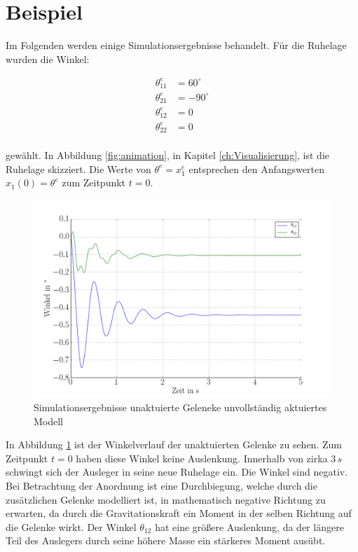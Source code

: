 \section*{Beispiel}

Im Folgenden werden einige Simulationsergebnisse behandelt. Für die Ruhelage wurden die Winkel:


\begin{align*}
\theta_{11}^e&=60^\circ\\
\theta_{21}^e&=-90^\circ\\
\theta_{12}^e&=0\\
\theta_{22}^e&=0\\
\end{align*}

gewählt. In Abbildung \ref{fig:animation}, in Kapitel \ref{ch:Visualisierung}, ist die Ruhelage skizziert. Die Werte von $\theta^e=x_1^e$ entsprechen den Anfangswerten $x_1(0)=\theta^e$ zum Zeitpunkt $t=0$.

\begin{figure}[h]
\centering
\includegraphics[width=1\linewidth]{RuhelageUnaktuierteGelenke.png}
\caption{Simulationsergebnisse unaktuierte Geleneke unvollständig aktuiertes Modell}
\label{fig:RuhelageUnaktuierteGelenke}
\end{figure}

In Abbildung \ref{fig:RuhelageUnaktuierteGelenke} ist der Winkelverlauf der unaktuierten Gelenke zu sehen. Zum Zeitpunkt $t=0$ haben diese Winkel keine Auslenkung. Innerhalb von zirka $3\,\si{s}$ schwingt sich der Ausleger in seine neue Ruhelage ein. Die Winkel sind negativ. Bei Betrachtung der Anordnung ist eine Durchbiegung, welche durch die zusätzlichen Gelenke modelliert ist, in mathematisch negative Richtung zu erwarten, da durch die Gravitationskraft ein Moment in der selben Richtung auf die Gelenke wirkt. Der Winkel $\theta_{12}$ hat eine größere Auslenkung, da der längere Teil des Auslegers durch seine höhere Masse ein stärkeres Moment ausübt.

